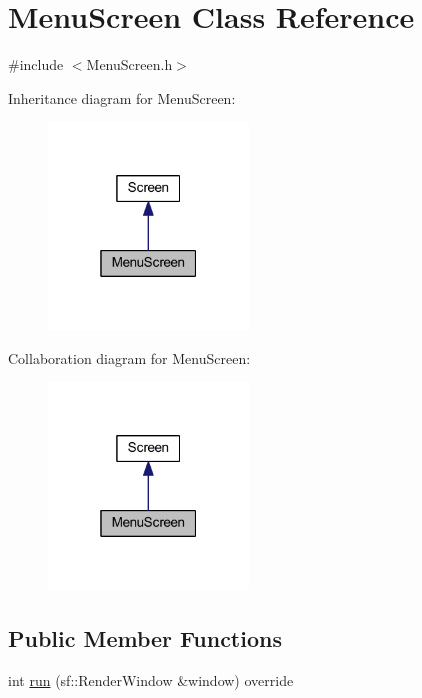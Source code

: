 \hypertarget{class_menu_screen}{}\section{Menu\+Screen Class Reference}
\label{class_menu_screen}


{\ttfamily \#include $<$Menu\+Screen.\+h$>$}



Inheritance diagram for Menu\+Screen\+:\nopagebreak
\begin{figure}[H]
\begin{center}
\leavevmode
\includegraphics[width=151pt]{class_menu_screen__inherit__graph}
\end{center}
\end{figure}


Collaboration diagram for Menu\+Screen\+:\nopagebreak
\begin{figure}[H]
\begin{center}
\leavevmode
\includegraphics[width=151pt]{class_menu_screen__coll__graph}
\end{center}
\end{figure}
\subsection*{Public Member Functions}
\begin{DoxyCompactItemize}
\item 
int \hyperlink{class_menu_screen_ad6e00debf1d2ddcaa716327598590cf5}{run} (sf\+::\+Render\+Window \&window) override
\end{DoxyCompactItemize}


